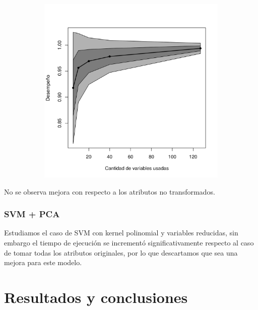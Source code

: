 \documentclass[a4paper,10pt]{article}
\begin{document}
\begin{figure}[H]
  \centering
  \begin{subfigure}[b]{0.4\textwidth}
    \includegraphics[width=\textwidth]{../imagenes/rf}
     
  \end{subfigure}
  \caption{}
  \label{fig:rf}
\end{figure}

No se observa mejora con respecto a los atributos no transformados. 

\subsubsection{SVM + PCA}

\par Estudiamos el caso de SVM con kernel polinomial y variables reducidas, sin embargo el tiempo de ejecución se incrementó significativamente respecto al caso de tomar todas los atributos originales, por lo que descartamos que sea una mejora para este modelo.

\section{Resultados y conclusiones}
\end{document}
